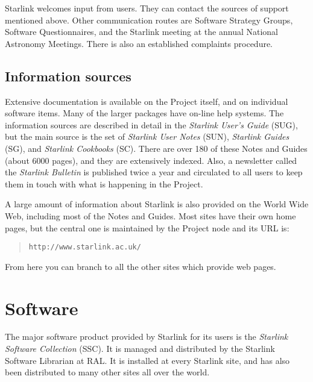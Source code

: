 \documentclass[twoside,11pt]{article}
\newcommand{\htmladdnormallink}[2]{#1}
\newcommand{\xref}[3]{#1}
\begin{document}
Starlink welcomes input from users.
They can contact the sources of support mentioned above.
Other communication routes are Software Strategy Groups, Software
Questionnaires, and the Starlink meeting at the annual National Astronomy
Meetings.
There is also an established complaints procedure.

\newpage

\subsection*{Information sources}

Extensive 
\htmladdnormallink{documentation}{http://www.starlink.ac.uk/documentation.html}
is available on the Project itself, and on individual software items.
Many of the larger packages have on-line help systems.
The information sources are described in detail in the {\em Starlink User's
Guide} (\xref{SUG}{sug}{}), but the main source is the set of
{\em Starlink User Notes}\/ (\htmladdnormallink{SUN}{http://www.starlink.ac.uk/sun.html}),
{\em Starlink Guides}\/ (\htmladdnormallink{SG}{http://www.starlink.ac.uk/sg.html}),
and {\em Starlink Cookbooks}\/ (\htmladdnormallink{SC}{http://www.starlink.ac.uk/sc.html}).
There are over 180 of these Notes and Guides (about 6000 pages), and they
are extensively indexed.
Also, a newsletter called the 
{\em \htmladdnormallink{Starlink Bulletin}
{http://www.starlink.ac.uk/bulletin.html}} 
is published twice a year and circulated to all users to keep them in touch
with what is happening in the Project.

A large amount of information about Starlink is also provided on the World
Wide Web, including most of the Notes and Guides.
Most sites have their own home pages, but the central one is maintained
by the 
\htmladdnormallink{Project node}{http://www.starlink.ac.uk/}
 and its URL is:
\begin{quote}
{\tt http://www.starlink.ac.uk/}
\end{quote}
From here you can branch to all the other sites which provide web pages.

\newpage

\section*{Software}

The major software product provided by Starlink for its users is the
{\em Starlink Software Collection}\/ 
(\htmladdnormallink{SSC}{http://www.starlink.ac.uk/software.html}).
It is managed and distributed by the Starlink Software Librarian at RAL.
It is installed at every Starlink site, and has also been distributed to
many other sites all over the world.
\end{document}
